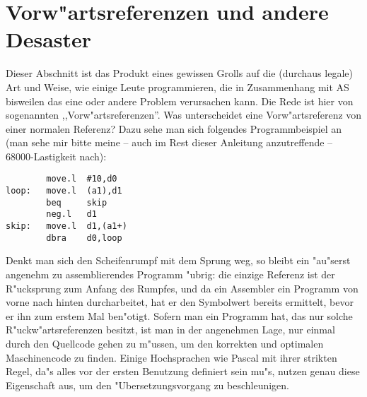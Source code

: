 \documentclass[12pt,a4paper,twoside]{report}
\begin{document}
\vspace{2mm}


\section{Vorw"artsreferenzen und andere Desaster}
\label{ForwRefs}

Dieser Abschnitt ist das Produkt eines gewissen Grolls auf die (durchaus
legale) Art und Weise, wie einige Leute programmieren, die in Zusammenhang
mit AS bisweilen das eine oder andere Problem verursachen kann.  Die Rede
ist hier von sogenannten ,,Vorw"artsreferenzen''.  Was unterscheidet eine
Vorw"artsreferenz von einer normalen Referenz?  Dazu sehe man sich folgendes
Programmbeispiel an (man sehe mir bitte meine -- auch im Rest dieser Anleitung
anzutreffende -- 68000-Lastigkeit nach):
\begin{verbatim}
        move.l  #10,d0
loop:   move.l  (a1),d1
        beq     skip
        neg.l   d1
skip:   move.l  d1,(a1+)
        dbra    d0,loop
\end{verbatim}
Denkt man sich den Scheifenrumpf mit dem Sprung weg, so bleibt ein
"au"serst angenehm zu assemblierendes Programm "ubrig: die einzige
Referenz ist der R"ucksprung zum Anfang des Rumpfes, und da ein
Assembler ein Programm von vorne nach hinten durcharbeitet, hat er
den Symbolwert bereits ermittelt, bevor er ihn zum erstem Mal ben"otigt.
Sofern man ein Programm hat, das nur solche R"uckw"artsreferenzen besitzt,
ist man in der angenehmen Lage, nur einmal durch den Quellcode gehen zu
m"ussen, um den korrekten und optimalen Maschinencode zu finden.  Einige
Hochsprachen wie Pascal mit ihrer strikten Regel, da"s alles vor der ersten
Benutzung definiert sein mu"s, nutzen genau diese Eigenschaft aus, um den
"Ubersetzungsvorgang zu beschleunigen.
\end{document}
